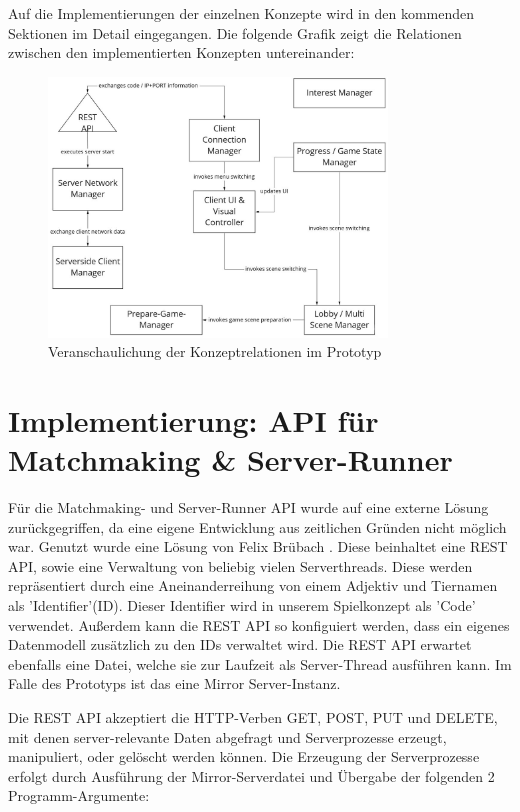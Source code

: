 Auf die Implementierungen der einzelnen Konzepte wird in den kommenden Sektionen im Detail eingegangen. Die folgende Grafik zeigt die Relationen zwischen den implementierten Konzepten untereinander:

\begin{figure}[H]
	\centering
	\includegraphics[width=90mm]{images/concept_relations.jpg}
	\caption[Architektur Konzept Relationen]{Veranschaulichung der Konzeptrelationen im Prototyp}
	\label{pic:concept_relations}
\end{figure}

\section{Implementierung: API für Matchmaking \& Server-Runner}

Für die Matchmaking- und Server-Runner API wurde auf eine externe Lösung zurückgegriffen, da eine eigene Entwicklung aus zeitlichen Gründen nicht möglich war. Genutzt wurde eine Lösung von Felix Brübach \cite{GitHub.20.02.2022}. Diese beinhaltet eine REST API, sowie eine Verwaltung von beliebig vielen Serverthreads. Diese werden repräsentiert durch eine Aneinanderreihung von einem Adjektiv und Tiernamen als 'Identifier'(ID). Dieser Identifier wird in unserem Spielkonzept als 'Code' verwendet. Außerdem kann die REST API so konfiguiert werden, dass ein eigenes Datenmodell zusätzlich zu den IDs verwaltet wird. Die REST API erwartet ebenfalls eine Datei, welche sie zur Laufzeit als Server-Thread ausführen kann. Im Falle des Prototyps ist das eine Mirror Server-Instanz.

Die REST API akzeptiert die HTTP-Verben GET, POST, PUT und DELETE, mit denen server-relevante Daten abgefragt und Serverprozesse erzeugt, manipuliert, oder gelöscht werden können. Die Erzeugung der Serverprozesse erfolgt durch Ausführung der Mirror-Serverdatei und Übergabe der folgenden 2 Programm-Argumente:

